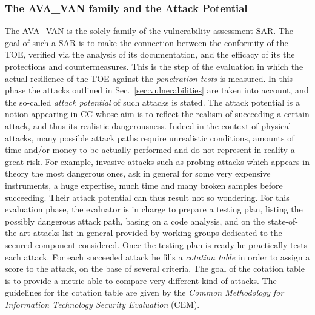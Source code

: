 \subsubsection{The AVA\_VAN family and the Attack Potential}
The AVA\_VAN is the solely family of the vulnerability assessment SAR. The goal of such a SAR is to make the connection between the conformity of the TOE, verified via the analysis of its documentation, and the efficacy of its the protections and countermeasures. This is the step of the evaluation in which the actual resilience of the TOE against the \emph{penetration tests} is measured. In this phase the attacks outlined in Sec.~\ref{sec:vulnerabilities} are taken into account, and the so-called \emph{attack potential} of such attacks is stated. The attack potential is a notion appearing in CC whose aim is to reflect the realism of succeeding a certain attack, and thus its realistic dangerousness. Indeed in the context of physical attacks, many possible attack paths require unrealistic conditions, amounts of time and/or money to be actually performed and do not represent in reality a great risk. For example, invasive attacks such as probing attacks which appears in theory the most dangerous ones, ask in general for some very expensive instruments, a huge expertise, much time and many broken samples before succeeding. Their attack potential can thus result not so wondering. For this evaluation phase, the evaluator is in charge to prepare a testing plan, listing the possibly dangerous attack path, basing on a code analysis, and on the state-of-the-art attacks list in general provided by working groups dedicated to the secured component considered. Once the testing plan is ready he practically tests each attack. For each succeeded attack he fills a \emph{cotation table} in order to assign a score to the attack, on the base of several criteria. The goal of the cotation table is to provide a metric able to compare very different kind of attacks. The guidelines for the cotation table are given by the \emph{Common Methodology for Information Technology Security Evaluation} (CEM). \\


